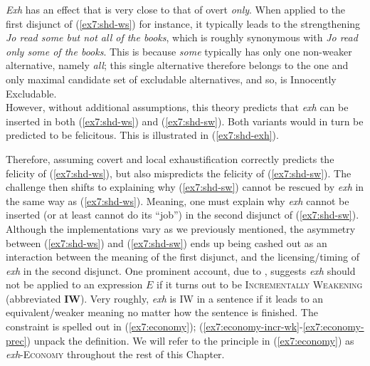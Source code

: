 \textit{Exh} has an effect that is very close to that of overt \textit{only}. When applied to the first disjunct of (\ref{ex7:shd-ws}) for instance, it typically leads to the strengthening \textit{Jo read some but not all of the books}, which is roughly synonymous with \textit{Jo read only some of the books}. This is because \textit{some} typically has only one non-weaker alternative, namely \textit{all}; this single alternative therefore belongs to the one and only maximal candidate set of excludable alternatives, and so, is Innocently Excludable.\\

However, without additional assumptions, this theory predicts that \textit{exh} can be inserted in both (\ref{ex7:shd-ws}) and (\ref{ex7:shd-sw}). Both variants would in turn be predicted to be felicitous. This is illustrated in (\ref{ex7:shd-exh}).

\begin{exe}
	\ex\label{ex7:shd-exh}
	\begin{xlist}
		\label{ex7:shd-ws-exh}
		\label{ex7:shd-sw-exh}
	\end{xlist}
\end{exe}

Therefore, assuming covert and local exhaustification correctly predicts the felicity of (\ref{ex7:shd-ws}), but also mispredicts the felicity of (\ref{ex7:shd-sw}). The challenge then shifts to explaining why (\ref{ex7:shd-sw}) cannot be rescued by \textit{exh} in the same way as (\ref{ex7:shd-ws}). Meaning, one must explain why \textit{exh} cannot be inserted (or at least cannot do its ``job'') in the second disjunct of (\ref{ex7:shd-sw}). \\

Although the implementations vary as we previously mentioned, the asymmetry between (\ref{ex7:shd-ws}) and (\ref{ex7:shd-sw}) ends up being cashed out as an interaction between the meaning of the first disjunct, and the licensing/timing of \textit{exh} in the second disjunct. One prominent account, due to \textcite{Fox2018a}, suggests \textit{exh} should not be applied to an expression $E$ if it turns out to be \textsc{Incrementally Weakening} (abbreviated \textbf{IW}). Very roughly, \textit{exh} is IW in a sentence if it leads to an equivalent/weaker meaning no matter how the sentence is finished. The constraint is spelled out in (\ref{ex7:economy}); (\ref{ex7:economy-incr-wk}-\ref{ex7:economy-prec}) unpack the definition. We will refer to the principle in (\ref{ex7:economy}) as \textit{exh}-\textsc{Economy} throughout the rest of this Chapter.

